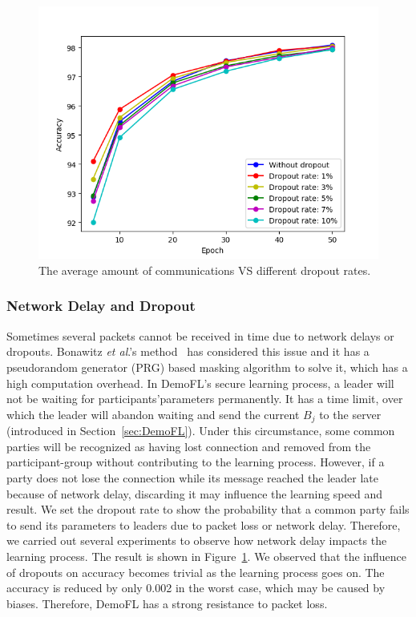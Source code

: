 \begin{figure}[!ht]
    \centering
    \includegraphics[width=\columnwidth]{img/dropout-acc.png}
    \caption{The average amount of communications VS different dropout rates.}
    \label{dropout-acc}
\end{figure}

\subsubsection{Network Delay and Dropout}
Sometimes several packets cannot be received in time due to network delays or dropouts. Bonawitz \emph{et al}.'s method~\cite{Practical} has considered this issue and it has a pseudorandom generator (PRG) based masking algorithm to solve it, which has a high computation overhead. In DemoFL's secure learning process, a leader will not be waiting for participants'parameters permanently. It has a time limit, over which the leader will abandon waiting and send the current $B_j$ to the server (introduced in Section~\ref{sec:DemoFL}). Under this circumstance, some common parties will be recognized as having lost connection and removed from the participant-group without contributing to the learning process. However, if a party does not lose the connection while its message reached the leader late because of network delay, discarding it may influence the learning speed and result. We set the dropout rate to show the probability that a common party fails to send its parameters to leaders due to packet loss or network delay. Therefore, we carried out several experiments to observe how network delay impacts the learning process. The result is shown in Figure~\ref{dropout-acc}. We observed that the influence of dropouts on accuracy becomes trivial as the learning process goes on. The accuracy is reduced by only 0.002 in the worst case, which may be caused by biases. Therefore, DemoFL has a strong resistance to packet loss. 
